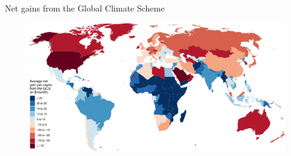 \documentclass[aspectratio=169,xcolor=dvipsnames, 11pt,mathserif]{beamer}
\begin{document}
\begin{framefont}{\small}
\begin{frame}{Net gains from the Global Climate Scheme\label{GCS_gain}  \hyperlink{other_distributive}{}}
    \begin{figure}
        \centering %
        \includegraphics[height=.9\textheight]{../figures/maps/mean_gain_2030.pdf} 
    \end{figure}
\end{frame}


\end{framefont}
\end{document}
